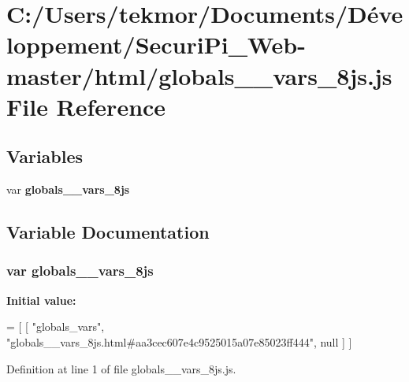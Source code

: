 \section{C\+:/\+Users/tekmor/\+Documents/\+Développement/\+Securi\+Pi\+\_\+\+Web-\/master/html/globals\+\_\+\+\_\+vars\+\_\+8js.js File Reference}
\label{globals____vars__8js_8js}
\subsection*{Variables}
\begin{DoxyCompactItemize}
\item 
var {\bf globals\+\_\+\+\_\+vars\+\_\+8js}
\end{DoxyCompactItemize}


\subsection{Variable Documentation}
\subsubsection[{globals\+\_\+\+\_\+vars\+\_\+8js}]{\setlength{\rightskip}{0pt plus 5cm}var globals\+\_\+\+\_\+vars\+\_\+8js}\label{globals____vars__8js_8js_ad6fca56ff1358e43cb7802aaf72aa675}
{\bfseries Initial value\+:}
\begin{DoxyCode}
=
[
    [ \textcolor{stringliteral}{"globals\_vars"}, \textcolor{stringliteral}{"globals\_\_vars\_8js.html#aa3cec607e4c9525015a07e85023ff444"}, null ]
]
\end{DoxyCode}


Definition at line 1 of file globals\+\_\+\+\_\+vars\+\_\+8js.\+js.

